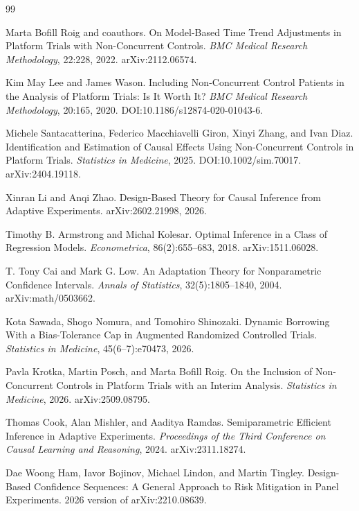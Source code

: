 \documentclass{article}
\begin{document}
\begin{thebibliography}{99}

   Marta Bofill Roig and coauthors. On Model-Based Time Trend Adjustments in Platform Trials with Non-Concurrent Controls. \emph{BMC Medical Research Methodology}, 22:228, 2022. arXiv:2112.06574.

   Kim May Lee and James Wason. Including Non-Concurrent Control Patients in the Analysis of Platform Trials: Is It Worth It? \emph{BMC Medical Research Methodology}, 20:165, 2020. DOI:10.1186/s12874-020-01043-6.

   Michele Santacatterina, Federico Macchiavelli Giron, Xinyi Zhang, and Ivan Diaz. Identification and Estimation of Causal Effects Using Non-Concurrent Controls in Platform Trials. \emph{Statistics in Medicine}, 2025. DOI:10.1002/sim.70017. arXiv:2404.19118.

   Xinran Li and Anqi Zhao. Design-Based Theory for Causal Inference from Adaptive Experiments. arXiv:2602.21998, 2026.

   Timothy B. Armstrong and Michal Kolesar. Optimal Inference in a Class of Regression Models. \emph{Econometrica}, 86(2):655--683, 2018. arXiv:1511.06028.

   T. Tony Cai and Mark G. Low. An Adaptation Theory for Nonparametric Confidence Intervals. \emph{Annals of Statistics}, 32(5):1805--1840, 2004. arXiv:math/0503662.

   Kota Sawada, Shogo Nomura, and Tomohiro Shinozaki. Dynamic Borrowing With a Bias-Tolerance Cap in Augmented Randomized Controlled Trials. \emph{Statistics in Medicine}, 45(6--7):e70473, 2026.

   Pavla Krotka, Martin Posch, and Marta Bofill Roig. On the Inclusion of Non-Concurrent Controls in Platform Trials with an Interim Analysis. \emph{Statistics in Medicine}, 2026. arXiv:2509.08795.

   Thomas Cook, Alan Mishler, and Aaditya Ramdas. Semiparametric Efficient Inference in Adaptive Experiments. \emph{Proceedings of the Third Conference on Causal Learning and Reasoning}, 2024. arXiv:2311.18274.

   Dae Woong Ham, Iavor Bojinov, Michael Lindon, and Martin Tingley. Design-Based Confidence Sequences: A General Approach to Risk Mitigation in Panel Experiments. 2026 version of arXiv:2210.08639.


\end{thebibliography}
\end{document}
